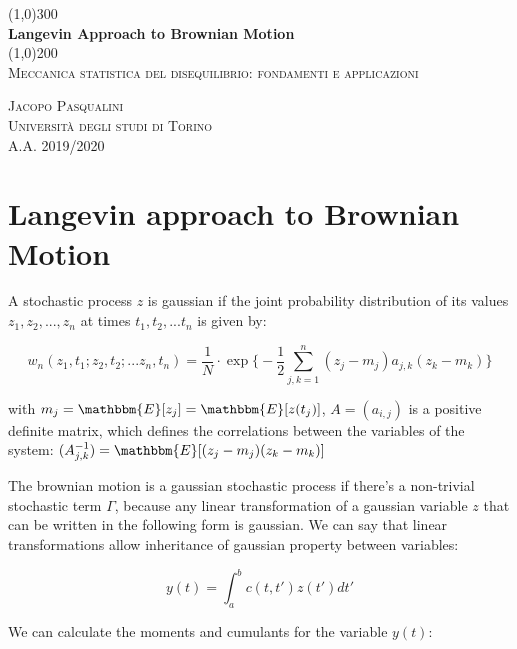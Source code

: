 \documentclass{article}
\begin{document}
\begin{titlepage}
	\begin{center}
	
	\line(1,0){300}\\
	[5mm]
	\huge{\bfseries Langevin Approach to Brownian Motion}\\
	[2mm]
	\line(1,0){200}\\
	[2cm]
	\textsc{\Large Meccanica statistica del disequilibrio: fondamenti e applicazioni} \\
	[8cm]
	
	\end{center}
	
	\begin{flushright}
	\textsc{\LARGE Jacopo Pasqualini}\\
	[0.5cm]
	\textsc{\large Università degli studi di Torino\\
	[0.5cm]
	A.A. 2019/2020 }
	\end{flushright}
	
\end{titlepage}

\section{Langevin approach to Brownian Motion}\label{sec:langapp}

A stochastic process $z$ is gaussian if the joint probability distribution of its values $z_1,z_2,...,z_n$ at times $t_1,t_2,...t_n$ is given by:

\begin{equation}
w_n(z_1,t_1;z_2,t_2;...z_n,t_n) = \frac{1}{ \textit{N} } \cdot \exp \Big \{  - \frac{1}{2} \sum_{j,k=1}^{n} (z_j - m_j ) a_{j,k} (z_k - m_k) \Big \}
\end{equation}

with $ m_j =\mathbbm{E} [z_j] = \mathbbm{E} [z(t_j)]$, $A = (a_{i,j})$ is a positive definite matrix, which defines the correlations between the variables of the system: $(A_{j,k}^{-1}) = \mathbbm{E}[(z_j-m_j)(z_k-m_k)]$

The brownian motion is a gaussian stochastic process if there's a non-trivial stochastic term $\Gamma$, because any linear transformation of a gaussian variable $z$ that can be written in the following form is gaussian. We can say that linear transformations allow inheritance of gaussian property between variables:

$$ y(t) = \int_{a}^{b} c(t,t') z(t') dt'$$

We can calculate the moments and cumulants for the variable $y(t)$:
\end{document}
